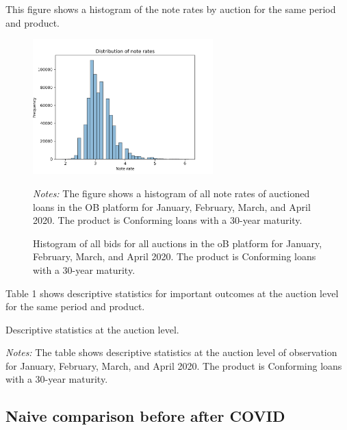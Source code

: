 \documentclass[11pt,a4paper]{article}
\begin{document}
This figure shows a histogram of the note rates by auction for the same period and product.
\begin{figure}[h]
  \centering
  \includegraphics[width=0.62\textwidth]{../results/figures/distribution_of_noterates.png}
  \caption{Histogram of all bids for all auctions in the oB platform for January, February, March, and April 2020. The product is Conforming loans with a 30-year maturity.}
  \begin{minipage}{\textwidth}
      \footnotesize{\textit{Notes:} The figure shows a histogram of all note rates of auctioned loans in the OB platform for January, February, March, and April 2020. The product is Conforming loans with a 30-year maturity. } 
      \end{minipage}
\end{figure}


\pagebreak
Table 1 shows descriptive statistics for important outcomes at the auction level for the same period and product. 


\begin{table}[h]
    \centering
    
    \caption{Descriptive statistics at the auction level. }
    \begin{minipage}{\textwidth}
        \footnotesize{\textit{Notes:} The table shows descriptive statistics at the auction level of observation for January, February, March, and April 2020. The product is Conforming loans with a 30-year maturity. } 
        \end{minipage}
\end{table}


\subsection{Naive comparison before after COVID}
\end{document}
